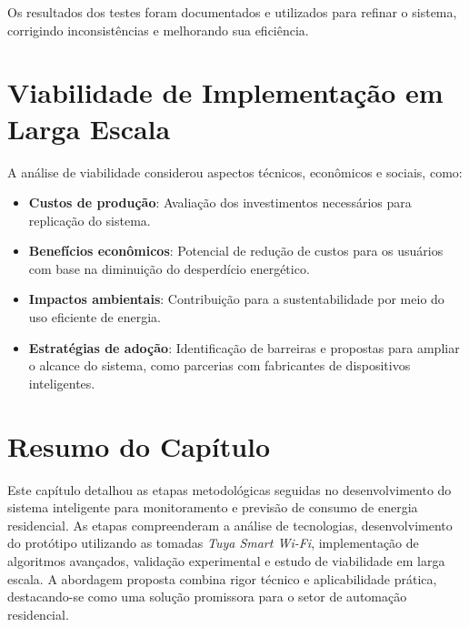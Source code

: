 Os resultados dos testes foram documentados e utilizados para refinar o sistema, corrigindo inconsistências e melhorando sua eficiência.

\section{Viabilidade de Implementação em Larga Escala}

A análise de viabilidade considerou aspectos técnicos, econômicos e sociais, como:

\begin{itemize}
    \item \textbf{Custos de produção}: Avaliação dos investimentos necessários para replicação do sistema.
    \item \textbf{Benefícios econômicos}: Potencial de redução de custos para os usuários com base na diminuição do desperdício energético.
    \item \textbf{Impactos ambientais}: Contribuição para a sustentabilidade por meio do uso eficiente de energia.
    \item \textbf{Estratégias de adoção}: Identificação de barreiras e propostas para ampliar o alcance do sistema, como parcerias com fabricantes de dispositivos inteligentes.
\end{itemize}

\section{Resumo do Capítulo}

Este capítulo detalhou as etapas metodológicas seguidas no desenvolvimento do sistema inteligente para monitoramento e previsão de consumo de energia residencial. As etapas compreenderam a análise de tecnologias, desenvolvimento do protótipo utilizando as tomadas \textit{Tuya Smart Wi-Fi}, implementação de algoritmos avançados, validação experimental e estudo de viabilidade em larga escala. A abordagem proposta combina rigor técnico e aplicabilidade prática, destacando-se como uma solução promissora para o setor de automação residencial.